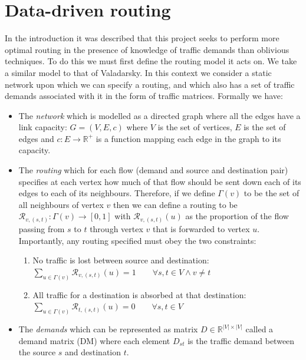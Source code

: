 \section{Data-driven routing}
\label{section:routing}
In the introduction it was described that this project seeks to perform more optimal routing in the presence of knowledge of traffic demands than oblivious techniques. To do this we must first define the routing model it acts on. We take a similar model to that of Valadarsky\cite{valadarsky2017learning}. In this context we consider a static network upon which we can specify a routing, and which also has a set of traffic demands associated with it in the form of traffic matrices. Formally we have:
\begin{itemize}
  \item The \emph{network} which is modelled as a directed graph where all the edges have a link capacity: $G=(V,E,c)$ where $V$ is the set of vertices, $E$ is the set of edges and $c : E \rightarrow \mathbb{R}^+$ is a function mapping each edge in the graph to its capacity.
  \item The \emph{routing} which for each flow (demand and source and destination pair) specifies at each vertex how much of that flow should be sent down each of its edges to each of its neighbours. Therefore, if we define $\Gamma(v)$ to be the set of all neighbours of vertex $v$ then we can define a routing to be $\mathcal{R}_{v,(s,t)} : \Gamma(v) \rightarrow [0,1]$ with $\mathcal{R}_{v,(s,t)}(u)$ as the proportion of the flow passing from $s$ to $t$ through vertex $v$ that is forwarded to vertex $u$. Importantly, any routing specified must obey the two constraints:
    \begin{enumerate}
      \item No traffic is lost between source and destination:\\
        $\sum_{u \in \Gamma(v)}{\mathcal{R}_{v,(s,t)}(u)} = 1 \qquad \forall s, t \in V \wedge v \neq t$
      \item All traffic for a destination is absorbed at that destination:\\
        $\sum_{u \in \Gamma(v)}{\mathcal{R}_{t,(s,t)}(u)} = 0 \qquad \forall s, t \in V$
    \end{enumerate}
  \item The \emph{demands} which can be represented as matrix $D \in \mathbb{R}^{|V|\times|V|}$ called a demand matrix (DM) where each element $D_{st}$ is the traffic demand between the source $s$ and destination $t$.
\end{itemize}

